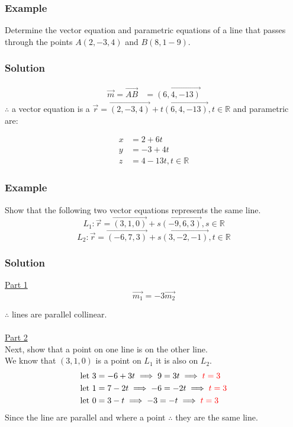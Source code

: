 \documentclass{article}
\begin{document}
\subsubsection*{Example}
Determine the vector equation and parametric equations of a line that passes through the points $A(2,-3,4)$ and $B(8,1-9)$.
\subsubsection*{Solution}
\begin{align*}
\vec{m}=\overrightarrow{AB}&=\overrightarrow{(6,4,-13)}
\end{align*}
$\therefore$ a vector equation is a $\vec{r}=\overrightarrow{(2,-3,4)}+t\overrightarrow{(6,4,-13)}, t \in \mathbb{R}$ and parametric are:

\begin{align*}
    x&=2+6t\\
    y&=-3+4t\\
    z&=4-13t, t \in \mathbb{R}
\end{align*}

\subsubsection*{Example}
Show that the following two vector equations represents the same line.
\[
    L_1: \vec{r}=\overrightarrow{(3,1,0)}+s\overrightarrow{(-9,6,3)}, s \in \mathbb{R}
\]
\[
 L_2: \vec{r}=\overrightarrow{(-6,7,3)}+s\overrightarrow{(3,-2,-1)}, t \in \mathbb{R}
\]
\subsubsection*{Solution}
\underline{Part 1}
\[
\overrightarrow{m_1}=-3\overrightarrow{m_2}
\]

$\therefore$ lines are parallel collinear.\\\\
\underline{Part 2}\\
Next, show that a point on one line is on the other line.\\
We know that $(3,1,0)$ is a point on $L_1$ it is also on $L_2$.
\begin{align*}
    \text{let } 3&=-6+3t \implies 9=3t \implies \textcolor{red}{t=3}\\
    \text{let } 1&=7-2t \implies -6 =-2t \implies \textcolor{red}{t=3}\\
    \text{let } 0&=3-t \implies -3=-t \implies \textcolor{red}{t=3}
\end{align*}
Since the line are parallel and where a point $\therefore$ they are the same line.
\end{document}
